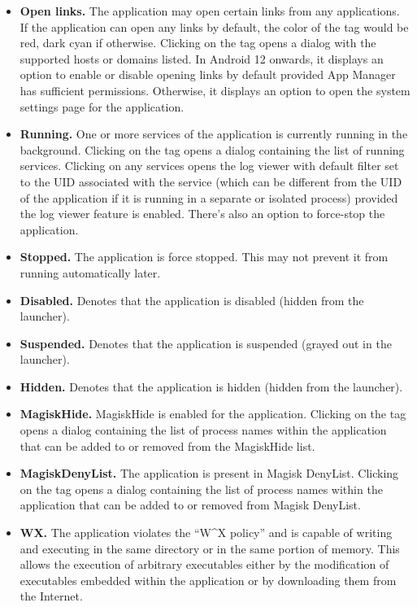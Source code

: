 \begin{itemize}
    \item \textbf{Open links.} The application may open certain links from any applications. If the
    application can open any links by default, the color of the tag would be red, dark cyan if
    otherwise. Clicking on the tag opens a dialog with the supported hosts or domains listed. In
    Android 12 onwards, it displays an option to enable or disable opening links by default provided
    App Manager has sufficient permissions. Otherwise, it displays an option to open the system
    settings page for the application.

    \item \textbf{Running.} One or more services of the application is currently running in the
    background. Clicking on the tag opens a dialog containing the list of running services. Clicking
    on any services opens the log viewer with default filter set to the UID associated with the
    service (which can be different from the UID of the application if it is running in a separate
    or isolated process) provided the log viewer feature is enabled. There's also an option to
    force-stop the application.

    \item \textbf{Stopped.} The application is force stopped. This may not prevent it from running automatically later.

    \item \textbf{Disabled.} Denotes that the application is disabled (hidden from the launcher).

    \item \textbf{Suspended.} Denotes that the application is suspended (grayed out in the launcher).

    \item \textbf{Hidden.} Denotes that the application is hidden (hidden from the launcher).

    \item \textbf{MagiskHide.} MagiskHide is enabled for the application. Clicking on the tag opens
    a dialog containing the list of process names within the application that can be added to or
    removed from the MagiskHide list.

    \item \textbf{MagiskDenyList.} The application is present in Magisk DenyList. Clicking on the
    tag opens a dialog containing the list of process names within the application that can be added
    to or removed from Magisk DenyList.

    \item \textbf{WX.} The application violates the ``W\textasciicircum{}X policy'' and is capable
    of writing and executing in the same directory or in the same portion of memory. This allows the
    execution of arbitrary executables either by the modification of executables embedded within the
    application or by downloading them from the Internet.\\


\end{itemize}
